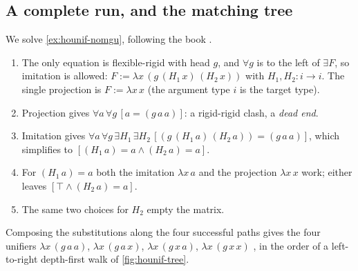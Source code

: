 \pagebreak
\subsection{A complete run, and the matching tree}

\begin{tutorial}[Huet's procedure on \texttt{(F a) = (g a a)}]
We solve \cref{ex:hounif-nomgu}, following the book .
\begin{enumerate}
  \item The only equation is flexible-rigid with head $g$, and $\forall g$ is to the left of $\exists F$, so
    imitation is allowed: $F:=\lambda x\,(g\,(H_1\,x)\,(H_2\,x))$ with $H_1,H_2:i\to i$. The single projection is
    $F:=\lambda x\,x$ (the argument type $i$ is the target type).
  \item Projection gives $\forall a\,\forall g\,[a=(g\,a\,a)]$: a rigid-rigid clash, a \emph{dead end}.
  \item Imitation gives $\forall a\,\forall g\,\exists H_1\,\exists H_2\,[(g\,(H_1\,a)\,(H_2\,a))=(g\,a\,a)]$, which
     simplifies to $[(H_1\,a)=a\wedge(H_2\,a)=a]$.
  \item For $(H_1\,a)=a$ both the imitation $\lambda x\,a$ and the projection $\lambda x\,x$ work; either leaves
    $[\top\wedge(H_2\,a)=a]$.
  \item The same two choices for $H_2$ empty the matrix.
\end{enumerate}
Composing the substitutions along the four successful paths gives the four unifiers
$\lambda x\,(g\,a\,a)$, $\lambda x\,(g\,a\,x)$, $\lambda x\,(g\,x\,a)$, $\lambda x\,(g\,x\,x)$ , in the order of a
left-to-right depth-first walk of \cref{fig:hounif-tree}.
\end{tutorial}

